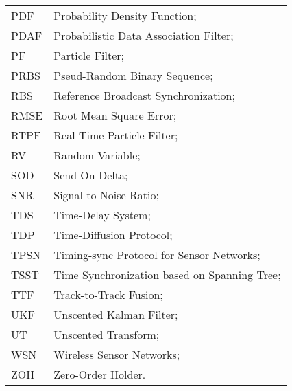 \begin{longtable}{ll}
	PDF         & Probability Density Function; \\
	PDAF		& Probabilistic Data Association Filter; \\
	PF 			& Particle Filter; \\
	PRBS		& Pseud-Random Binary Sequence; \\
	RBS			& Reference Broadcast Synchronization; \\
	RMSE		& Root Mean Square Error; \\
	RTPF		& Real-Time Particle Filter; \\
	RV			& Random Variable; \\
	SOD			& Send-On-Delta; \\
	SNR			& Signal-to-Noise Ratio; \\
	TDS			& Time-Delay System; \\
	TDP			& Time-Diffusion Protocol; \\
	TPSN		& Timing-sync Protocol for Sensor Networks; \\
	TSST		& Time Synchronization based on Spanning Tree; \\
	TTF 		& Track-to-Track Fusion; \\
	UKF			& Unscented Kalman Filter; \\
	UT			& Unscented Transform; \\
	WSN			& Wireless Sensor Networks; \\
	ZOH			& Zero-Order Holder. \\
\end{longtable}


